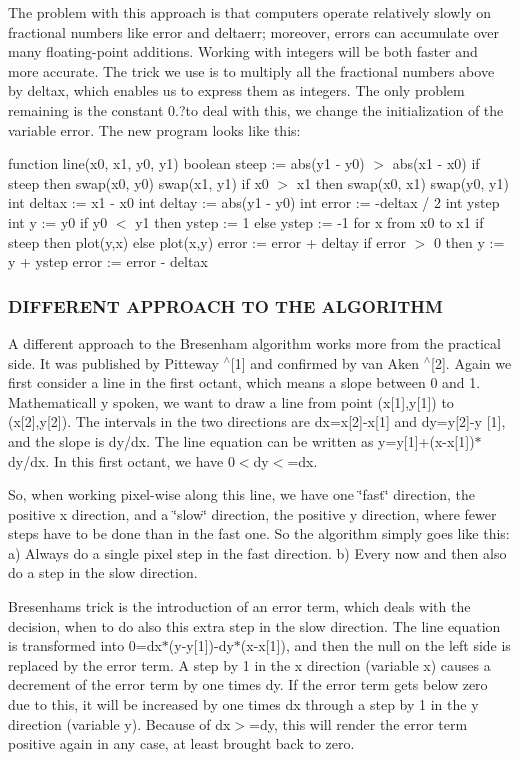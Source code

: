 The problem with this approach is that computers operate relatively slowly on fractional numbers like error and deltaerr; moreover, errors can accumulate over many floating-\/point additions. Working with integers will be both faster and more accurate. The trick we use is to multiply all the fractional numbers above by deltax, which enables us to express them as integers. The only problem remaining is the constant 0.?to deal with this, we change the initialization of the variable error. The new program looks like this\+:

function line(x0, x1, y0, y1) boolean steep \+:= abs(y1 -\/ y0) $>$ abs(x1 -\/ x0) if steep then swap(x0, y0) swap(x1, y1) if x0 $>$ x1 then swap(x0, x1) swap(y0, y1) int deltax \+:= x1 -\/ x0 int deltay \+:= abs(y1 -\/ y0) int error \+:= -\/deltax / 2 int ystep int y \+:= y0 if y0 $<$ y1 then ystep \+:= 1 else ystep \+:= -\/1 for x from x0 to x1 if steep then plot(y,x) else plot(x,y) error \+:= error + deltay if error $>$ 0 then y \+:= y + ystep error \+:= error -\/ deltax

\subsubsection*{D\+I\+F\+F\+E\+R\+E\+NT A\+P\+P\+R\+O\+A\+CH TO T\+HE A\+L\+G\+O\+R\+I\+T\+HM}

A different approach to the Bresenham algorithm works more from the practical side. It was published by Pitteway $^\wedge$\mbox{[}1\mbox{]} and confirmed by van Aken $^\wedge$\mbox{[}2\mbox{]}. Again we first consider a line in the first octant, which means a slope between 0 and 1. Mathematicall y spoken, we want to draw a line from point (x\mbox{[}1\mbox{]},y\mbox{[}1\mbox{]}) to (x\mbox{[}2\mbox{]},y\mbox{[}2\mbox{]}). The intervals in the two directions are dx=x\mbox{[}2\mbox{]}-\/x\mbox{[}1\mbox{]} and dy=y\mbox{[}2\mbox{]}-\/y \mbox{[}1\mbox{]}, and the slope is dy/dx. The line equation can be written as y=y\mbox{[}1\mbox{]}+(x-\/x\mbox{[}1\mbox{]})$\ast$dy/dx. In this first octant, we have 0$<$dy$<$=dx.

So, when working pixel-\/wise along this line, we have one \char`\"{}fast\char`\"{} direction, the positive x direction, and a \char`\"{}slow\char`\"{} direction, the positive y direction, where fewer steps have to be done than in the fast one. So the algorithm simply goes like this\+: a) Always do a single pixel step in the fast direction. b) Every now and then also do a step in the slow direction.

Bresenham\textquotesingle{}s trick is the introduction of an error term, which deals with the decision, when to do also this extra step in the slow direction. The line equation is transformed into 0=dx$\ast$(y-\/y\mbox{[}1\mbox{]})-\/dy$\ast$(x-\/x\mbox{[}1\mbox{]}), and then the null on the left side is replaced by the error term. A step by 1 in the x direction (variable x) causes a decrement of the error term by one times dy. If the error term gets below zero due to this, it will be increased by one times dx through a step by 1 in the y direction (variable y). Because of dx$>$=dy, this will render the error term positive again in any case, at least brought back to zero.

